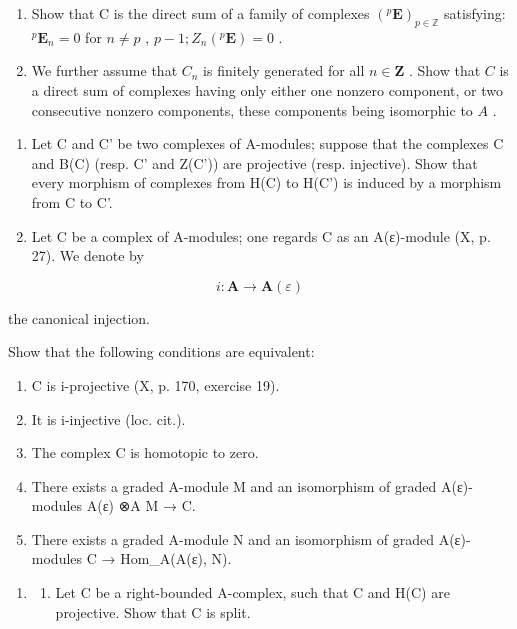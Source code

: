 \begin{enumerate}
\def\labelenumi{\alph{enumi})}
\item
  Show that C is the direct sum of a family of complexes \((^{p}\mathbf{E})_{p\in \mathbb{Z}}\) satisfying: \(^{p}\mathbf{E}_{n} = 0\) for \(n\neq p\) , \(p - 1 ; Z_{n}(^{p}\mathbf{E}) = 0\) .
\item
  We further assume that \(C_n\) is finitely generated for all \(n \in \mathbf{Z}\) . Show that \(C\) is a direct sum of complexes having only either one nonzero component, or two consecutive nonzero components, these components being isomorphic to \(A\) .
\end{enumerate}

\begin{enumerate}
\def\labelenumi{\arabic{enumi})}
\setcounter{enumi}{1}
\item
  Let C and C' be two complexes of A-modules; suppose that the complexes C and B(C) (resp. C' and Z(C')) are projective (resp. injective). Show that every morphism of complexes from H(C) to H(C') is induced by a morphism from C to C'.
\item
  Let C be a complex of A-modules; one regards C as an A(ε)-module (X, p. 27). We denote by
\end{enumerate}

\[
i: \mathbf {A} \rightarrow \mathbf {A} (\varepsilon)
\]

the canonical injection.

Show that the following conditions are equivalent:

\begin{enumerate}
\def\labelenumi{(\roman{enumi})}
\item
  C is i-projective (X, p. 170, exercise 19).
\item
  It is i-injective (loc. cit.).
\item
  The complex C is homotopic to zero.
\item
  There exists a graded A-module M and an isomorphism of graded A(ε)-modules A(ε) ⊗A M → C.
\item
  There exists a graded A-module N and an isomorphism of graded A(ε)-modules C → Hom\_A(A(ε), N).
\end{enumerate}

\begin{enumerate}
\def\labelenumi{\arabic{enumi})}
\setcounter{enumi}{3}
\tightlist
\item
  \begin{enumerate}
  \def\labelenumii{\alph{enumii})}
  \tightlist
  \item
    Let C be a right-bounded A-complex, such that C and H(C) are projective. Show that C is split.
  \end{enumerate}
\end{enumerate}

